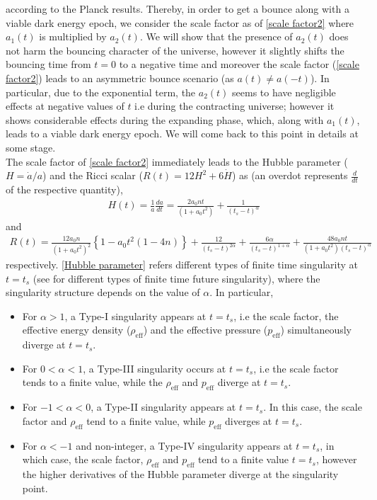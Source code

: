 \documentclass{article}
\begin{document}
according to the Planck results. Thereby, in order to get a bounce along with a viable dark energy epoch, we consider the scale factor 
as of \ref{scale factor2} where $a_1(t)$ is multiplied by $a_2(t)$. 
We will show that the presence of $a_2(t)$ does not harm the bouncing character of the universe, however it slightly shifts the bouncing time 
from $t = 0$ to a negative time and moreover the scale factor (\ref{scale factor2}) leads to an asymmetric bounce scenario (as $a(t) \neq a(-t)$). 
In particular, due to the exponential term, the $a_2(t)$ seems to have negligible effects at negative values of $t$ 
i.e during the contracting universe; however it shows considerable effects during the expanding phase, which, along with $a_1(t)$, leads to a 
viable dark energy epoch. We will come back to this point in details at some stage.\\
The scale factor of \ref{scale factor2} immediately leads to the Hubble parameter ($H = \dot{a}/a$) and the Ricci scalar 
($R(t) = 12H^2 + 6\dot{H}$) as (an overdot represents $\frac{d}{dt}$ of the respective quantity),
\begin{eqnarray}
 H(t) = \frac{1}{a}\frac{da}{dt} = \frac{2a_0nt}{\left(1 + a_0t^2\right)} + \frac{1}{\left(t_s - t\right)^{\alpha}}
 \label{Hubble parameter}
\end{eqnarray}
and
\begin{eqnarray}
 R(t) = \frac{12a_0n}{\left(1 + a_0t^2\right)^2}\left\{1 - a_0t^2\left(1-4n\right)\right\} 
 + \frac{12}{\left(t_s - t\right)^{2\alpha}} + \frac{6\alpha}{\left(t_s - t\right)^{1+\alpha}} + \frac{48a_0nt}{\left(1 + a_0t^2\right)
 \left(t_s - t\right)^{\alpha}}
 \label{ricci scalar}
\end{eqnarray}
respectively. \ref{Hubble parameter} refers different types of finite time singularity at $t = t_s$ (see \cite{Nojiri:2005sx} for different 
types of finite time future singularity), where the singularity structure depends 
on the value of $\alpha$. In particular,
\begin{itemize}
 \item For $\alpha > 1$, a Type-I singularity appears at $t = t_s$, i.e the scale factor, the effective energy density ($\rho_\mathrm{eff}$) 
 and the effective pressure ($p_\mathrm{eff}$) simultaneously diverge at $t = t_s$.  
 
 \item For $0 < \alpha < 1$, a Type-III singularity occurs at $t = t_s$, i.e the scale factor tends to a finite value, while the $\rho_\mathrm{eff}$ and 
 $p_\mathrm{eff}$ diverge at $t = t_s$.
 
 \item For $-1 < \alpha < 0$, a Type-II singularity appears at $t = t_s$. In this case, the scale factor and $\rho_\mathrm{eff}$ tend to a finite value, 
 while $p_\mathrm{eff}$ diverges at $t = t_s$.
 
 \item For $\alpha < -1$ and non-integer, 
 a Type-IV singularity appears at $t = t_s$, in which case, the scale factor, $\rho_\mathrm{eff}$ and $p_\mathrm{eff}$ 
 tend to a finite value $t = t_s$, however the higher derivatives of the Hubble parameter diverge at the singularity point.
\end{itemize}
\end{document}
